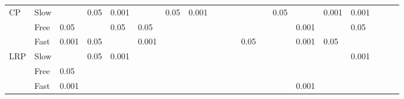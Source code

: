 \begin{table}
\begin{tabular}{llllllllllllllllllll}
\cline{1-20}
\multirow{3}{*}{CP} & Slow &            &       0.05 &      0.001 &            &       0.05 &      0.001 &            &            &            &            &            &       0.05 &            &      0.001 &      0.001 &            &            &            \\
    & Free &       0.05 &            &       0.05 &       0.05 &            &            &            &            &            &            &            &            &      0.001 &            &       0.05 &            &            &            \\
    & Fast &      0.001 &       0.05 &            &      0.001 &            &            &            &            &            &       0.05 &            &            &      0.001 &       0.05 &            &            &            &            \\
\cline{1-20}
\multirow{3}{*}{LRP} & Slow &            &       0.05 &      0.001 &            &            &            &            &            &            &            &            &            &            &            &      0.001 &            &            &            \\
    & Free &       0.05 &            &            &            &            &            &            &            &            &            &            &            &            &            &            &            &            &            \\
    & Fast &      0.001 &            &            &            &            &            &            &            &            &            &            &            &      0.001 &            &            &            &            &            \\
\bottomrule
\end{tabular}
\end{table}
